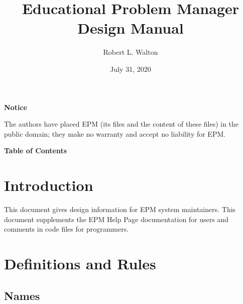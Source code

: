 \documentclass[12pt]{article}
\makeatletter
\renewcommand\tableofcontents{%
    \begin{list}{}%
	     {\setlength{\itemsep}{0in}%
	      \setlength{\topsep}{0in}%
	      \setlength{\parsep}{1ex}%
	      \setlength{\labelwidth}{0in}%
	      \setlength{\baselineskip}{1.5ex}%
	      \setlength{\leftmargin}{0.8in}%
	      \setlength{\rightmargin}{0.8in}}%
    \item\@starttoc{toc}%
    \end{list}}
\makeatother
\begin{document}
        
\title{Educational Problem Manager\\
Design Manual}

\author{Robert L. Walton}

\date{July 31, 2020}
 
\maketitle

\begin{center}
{\large \bf Notice}
\\[2ex]
\begin{minipage}{5.5in}
The authors have placed EPM (its files and the content of these files) in
the public domain; they make no warranty and accept
no liability for EPM.
\end{minipage}
\end{center}
\begin{center}
\large \bf Table of Contents
\end{center}

\bigskip

\tableofcontents 

\newpage

\section{Introduction}

This document gives design information for EPM system maintainers.
This document supplements the EPM Help Page documentation for
users and comments in code files for programmers.

\section{Definitions and Rules}

\subsection{Names}
\end{document}
